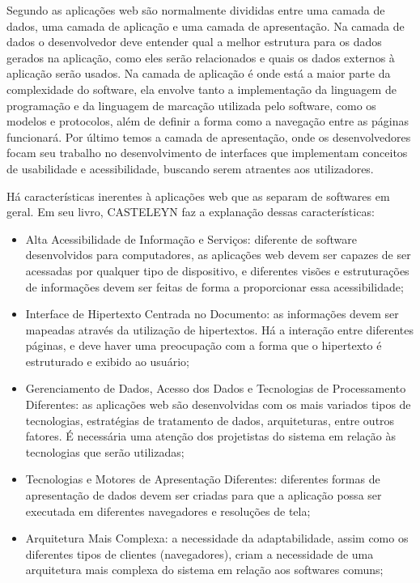 Segundo \cite{casteleyn2009engineering} as aplicações web são normalmente divididas entre uma camada de dados, uma camada de aplicação e uma camada de apresentação. Na camada de dados o desenvolvedor deve entender qual a melhor estrutura para os dados gerados na aplicação, como eles serão relacionados e quais os dados externos à aplicação serão usados. Na camada de aplicação é onde está a maior parte da complexidade do software, ela envolve tanto a implementação da linguagem de programação e da linguagem de marcação utilizada pelo software, como os modelos e protocolos, além de definir a forma como a navegação entre as páginas funcionará. Por último temos a camada de apresentação, onde os desenvolvedores focam seu trabalho no desenvolvimento de interfaces que implementam conceitos de usabilidade e acessibilidade, buscando serem atraentes aos utilizadores.

Há características inerentes à aplicações web que as separam de softwares em geral. Em seu livro, CASTELEYN faz a explanação dessas características:

\begin{itemize}
    \item Alta Acessibilidade de Informação e Serviços: diferente de software desenvolvidos para computadores, as aplicações web devem ser capazes de ser acessadas por qualquer tipo de dispositivo, e diferentes visões e estruturações de informações devem ser feitas de forma a proporcionar essa acessibilidade;
    \item Interface de Hipertexto Centrada no Documento: as informações devem ser mapeadas através da utilização de hipertextos. Há a interação entre diferentes páginas, e deve haver uma preocupação com a forma que o hipertexto é estruturado e exibido ao usuário;
    \item Gerenciamento de Dados, Acesso dos Dados e Tecnologias de Processamento Diferentes: as aplicações web são desenvolvidas com os mais variados tipos de tecnologias, estratégias de tratamento de dados, arquiteturas, entre outros fatores. É necessária uma atenção dos projetistas do sistema em relação às tecnologias que serão utilizadas;
    \item Tecnologias e Motores de Apresentação Diferentes: diferentes formas de apresentação de dados devem ser criadas para que a aplicação possa ser executada em diferentes navegadores e resoluções de tela;
    \item Arquitetura Mais Complexa: a necessidade da adaptabilidade, assim como os diferentes tipos de clientes (navegadores), criam a necessidade de uma arquitetura mais complexa do sistema em relação aos softwares comuns;
\end{itemize}

